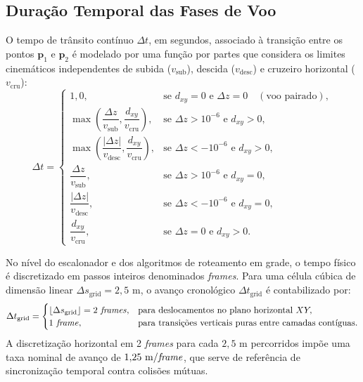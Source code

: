 \subsection{Duração Temporal das Fases de Voo}

O tempo de trânsito contínuo $\Delta t$, em segundos, associado à transição entre os pontos $\mathbf{p}_1$ e $\mathbf{p}_2$ é modelado por uma função por partes que considera os limites cinemáticos independentes de subida ($v_{\text{sub}}$), descida ($v_{\text{desc}}$) e cruzeiro horizontal ($v_{\text{cru}}$):
\begin{equation}\label{eq:delta_t_continuo}
\Delta t = \begin{cases} 
1{,}0, & \text{se } d_{xy} = 0 \text{ e } \Delta z = 0 \quad (\text{voo pairado}), \\
\max\left( \dfrac{\Delta z}{v_{\text{sub}}}, \dfrac{d_{xy}}{v_{\text{cru}}} \right), & \text{se } \Delta z > 10^{-6} \text{ e } d_{xy} > 0, \\
\max\left( \dfrac{|\Delta z|}{v_{\text{desc}}}, \dfrac{d_{xy}}{v_{\text{cru}}} \right), & \text{se } \Delta z < -10^{-6} \text{ e } d_{xy} > 0, \\
\dfrac{\Delta z}{v_{\text{sub}}}, & \text{se } \Delta z > 10^{-6} \text{ e } d_{xy} = 0, \\
\dfrac{|\Delta z|}{v_{\text{desc}}}, & \text{se } \Delta z < -10^{-6} \text{ e } d_{xy} = 0, \\
\dfrac{d_{xy}}{v_{\text{cru}}}, & \text{se } \Delta z = 0 \text{ e } d_{xy} > 0.
\end{cases}
\end{equation}

No nível do escalonador e dos algoritmos de roteamento em grade, o tempo físico é discretizado em passos inteiros denominados \textit{frames}. Para uma célula cúbica de dimensão linear $\Delta s_{\text{grid}} = 2{,}5\text{ m}$, o avanço cronológico $\Delta t_{\text{grid}}$ é contabilizado por:
\begin{equation}\label{eq:delta_t_grid}
\Delta t_{\text{grid}} = \begin{cases} 
\lfloor \Delta s_{\text{grid}} \rfloor = 2 \text{ \textit{frames}}, & \text{para deslocamentos no plano horizontal } XY, \\
1 \text{ \textit{frame}}, & \text{para transições verticais puras entre camadas contíguas}.
\end{cases}
\end{equation}
A discretização horizontal em 2 \textit{frames} para cada $2{,}5\text{ m}$ percorridos impõe uma taxa nominal de avanço de $1{,}25\text{ m/\textit{frame}}$, que serve de referência de sincronização temporal contra colisões mútuas.

